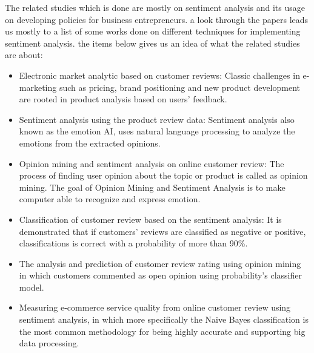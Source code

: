 The related studies which is done are mostly on sentiment analysis and its usage on developing policies for business entrepreneurs. a look through the papers leads us mostly to a list of some works done on different techniques for implementing sentiment analysis. the items below gives us an idea of what the related studies are about:
\begin{itemize}
    \item Electronic market analytic based on customer reviews: Classic challenges in e-marketing such as pricing, brand positioning and new product development are rooted in product analysis based on users’ feedback.
    \item Sentiment analysis using the product review data: Sentiment analysis also known as the emotion AI, uses natural language processing to analyze the emotions from the extracted opinions.
    \item Opinion mining and sentiment analysis on online customer review: The process of finding user opinion about the topic or product is called as opinion mining. The goal of Opinion Mining and Sentiment Analysis is to make computer able to recognize and express emotion.
    \item Classification of customer review based on the sentiment analysis: It is demonstrated that if customers' reviews are classified as negative or positive, classifications is correct with a probability of more than 90\%.
    \item The analysis and prediction of customer review rating using opinion mining in which customers commented as open opinion using probability's classifier model.
    \item Measuring e-commerce service quality from online customer review using sentiment analysis, in which more specifically the Naive Bayes classification is the most common methodology for being highly accurate and supporting big data processing.
\end{itemize}
